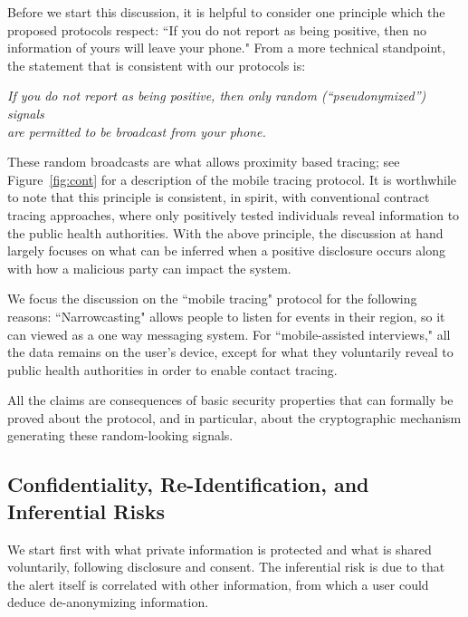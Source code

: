 Before we start this discussion, it is helpful to consider one principle which the proposed protocols respect:
 ``If you do not report as being positive, then no information of yours will leave your phone." From a more technical standpoint, the statement that is consistent with our protocols is:
\begin{center}
 \emph{If you do not report as being positive, then only random  (``pseudonymized'') signals\\
 are permitted to be broadcast from your phone.} 
\end{center}
These random broadcasts are what allows proximity based tracing; see Figure~\ref{fig:cont} for a description of the mobile tracing protocol.
It is worthwhile to note that this principle is consistent, in spirit, with conventional contract tracing approaches, where only positively tested individuals reveal information to the public health authorities.  With the above principle, the discussion at hand largely focuses on what can be inferred when a positive disclosure occurs along with how a malicious party can impact the system.

We focus the discussion on the ``mobile tracing" protocol for the following reasons:  ``Narrowcasting" allows people to listen for events in their region, so it can viewed as a one way messaging system. For ``mobile-assisted interviews," all the data remains on the user's device, except for what they voluntarily reveal to public health authorities in order to enable contact tracing.


All the claims are consequences of basic security properties that can formally be proved about the protocol, and in particular, about the cryptographic mechanism generating these random-looking signals. 

\subsection{Confidentiality, Re-Identification, and Inferential Risks}

We start first with what private information is protected and what is shared voluntarily, following disclosure and consent.  The inferential risk is due to that the alert itself is correlated with other information, from which a user could deduce de-anonymizing information.


